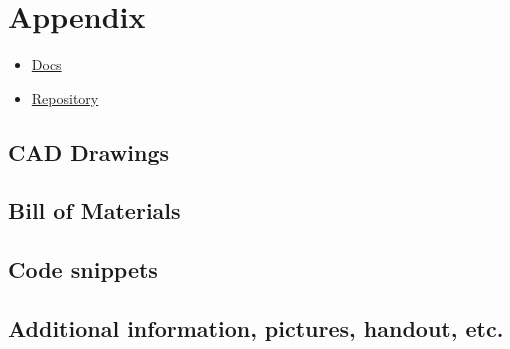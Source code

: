 \chapter{Appendix}
\label{ch:appendix}

\begin{itemize}
    \item \href{https://haziqsabtu.github.io/SpeedCameraPi/}{Docs}
    \item \href{https://github.com/HaziqSabtu/SpeedCameraPi}{Repository}
\end{itemize}

\section{CAD Drawings}
\section{Bill of Materials}

\section{Code snippets}
\section{Additional information, pictures, handout, etc.}
